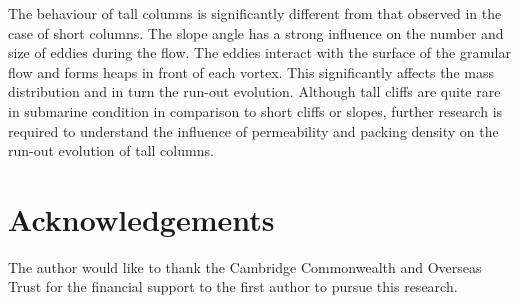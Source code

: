 \documentclass[epj,twocolumn]{webofc}
\begin{document}
The behaviour of tall columns is significantly different from that observed in 
the case of short columns. The slope angle has a strong influence on the number 
and size of eddies during the flow. The eddies interact with the surface of the 
granular flow and forms heaps in front of each vortex. This significantly 
affects the mass distribution and in turn the run-out evolution. Although tall 
cliffs are quite rare in submarine condition in comparison to short cliffs or 
slopes, further research is required to understand the influence of 
permeability and packing density on the run-out evolution of tall columns. 



\section*{Acknowledgements}
The author would like to thank the Cambridge Commonwealth and Overseas Trust for the financial support to the
first author to pursue this research.

%
% 
%
%
 
\end{document}
